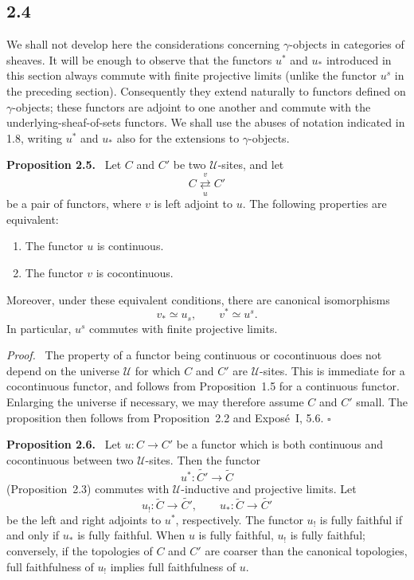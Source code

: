 \documentclass[11pt]{article}
\newcommand{\U}{\mathcal{U}}
\newcommand{\qedtext}{\hfill\(\square\)}
\newenvironment{statement}[1]{\par\medskip\noindent\textbf{#1.}\ }{\par\medskip}
\newenvironment{prooftext}{\par\noindent\emph{Proof.}\ }{\par\medskip}
\begin{document}
\subsection*{2.4}
We shall not develop here the considerations concerning \(\gamma\)-objects in categories of sheaves. It will be enough to observe that the functors \(u^*\) and \(u_*\) introduced in this section always commute with finite projective limits (unlike the functor \(u^s\) in the preceding section). Consequently they extend naturally to functors defined on \(\gamma\)-objects; these functors are adjoint to one another and commute with the underlying-sheaf-of-sets functors. We shall use the abuses of notation indicated in 1.8, writing \(u^*\) and \(u_*\) also for the extensions to \(\gamma\)-objects.

\begin{statement}{Proposition 2.5}
Let \(C\) and \(C'\) be two \(\U\)-sites, and let
\[
C\underset{u}{\stackrel{v}{\rightleftarrows}} C'
\]
be a pair of functors, where \(v\) is left adjoint to \(u\). The following properties are equivalent:
\begin{enumerate}[label=\roman*)]
\item The functor \(u\) is continuous.
\item The functor \(v\) is cocontinuous.
\end{enumerate}
Moreover, under these equivalent conditions, there are canonical isomorphisms
\[
v_*\simeq u_s,
\qquad
v^*\simeq u^s.
\]
In particular, \(u^s\) commutes with finite projective limits.
\end{statement}

\begin{prooftext}
The property of a functor being continuous or cocontinuous does not depend on the universe \(\U\) for which \(C\) and \(C'\) are \(\U\)-sites. This is immediate for a cocontinuous functor, and follows from Proposition~1.5 for a continuous functor. Enlarging the universe if necessary, we may therefore assume \(C\) and \(C'\) small. The proposition then follows from Proposition~2.2 and Expos\'e~I, 5.6. \qedtext
\end{prooftext}

\begin{statement}{Proposition 2.6}
Let \(u:C\to C'\) be a functor which is both continuous and cocontinuous between two \(\U\)-sites. Then the functor
\[
u^*:\widetilde{C'}\longrightarrow\widetilde C
\]
(Proposition~2.3) commutes with \(\U\)-inductive and projective limits. Let
\[
u_!:\widetilde C\longrightarrow\widetilde{C'},
\qquad
u_*:\widetilde C\longrightarrow\widetilde{C'}
\]
be the left and right adjoints to \(u^*\), respectively. The functor \(u_!\) is fully faithful if and only if \(u_*\) is fully faithful. When \(u\) is fully faithful, \(u_!\) is fully faithful; conversely, if the topologies of \(C\) and \(C'\) are coarser than the canonical topologies, full faithfulness of \(u_!\) implies full faithfulness of \(u\).
\end{statement}
\end{document}
